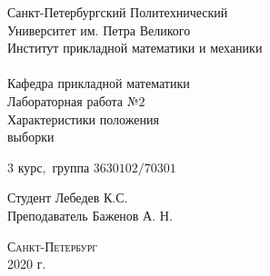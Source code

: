 \documentclass[a4]{article}
\begin{document}
\def\contentsname{\LARGE{Содержание}}
\thispagestyle{empty}
\begin{center} 
\vspace{2cm} 
{\Large \sc Санкт-Петербургский Политехнический}\\
\vspace{2mm}
{\Large \sc Университет} им. {\Large\sc Петра Великого}\\
\vspace{1cm}
{\large \sc Институт прикладной математики и механики\\ 
\vspace{0.5mm}
\textsc{}}\\ 
\vspace{0.5mm}
{\large\sc Кафедра прикладной математики}\\
\vspace{15mm}
{\huge \sc Лабораторная работа №$2$\\
\vspace{0.1cm}
Характеристики положения\\
\vspace{0.5cm}
выборки
\vspace{6mm}
 }
\vspace*{2mm}
\vspace{1cm}

{\sc $3$ курс$,$ группа $3630102/70301$}

\vspace{2cm} 
Студент \hfill Лебедев К.С.\\
\vspace{1cm}
Преподаватель \hfill Баженов А. Н.\\
\vspace{20mm} 

\end{center} 
\begin{center}
\vfill {\large\textsc{Санкт-Петербург}}\\ 
2020 г.
\end{center}

\end{document}
